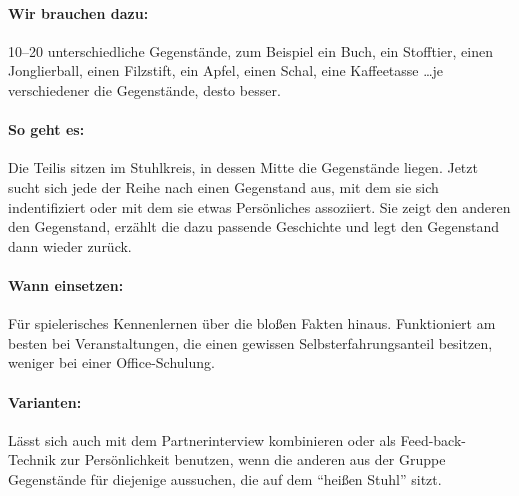 \paragraph{Wir brauchen dazu:} 10--20 unterschiedliche Gegenstände, zum Beispiel ein Buch, ein Stofftier, einen Jonglierball, einen Filzstift, ein Apfel, einen Schal, eine Kaffeetasse \ldots je verschiedener die Gegenstände, desto besser. 
\paragraph{So geht es:} Die Teilis sitzen im Stuhlkreis, in dessen Mitte die Gegenstände liegen. Jetzt sucht sich jede der Reihe nach einen Gegenstand aus, mit dem sie sich indentifiziert oder mit dem sie etwas Persönliches assoziiert. Sie zeigt den anderen den Gegenstand, erzählt die dazu passende Geschichte und legt den Gegenstand dann wieder zurück.
\paragraph{Wann einsetzen:} Für spielerisches Kennenlernen über die bloßen Fakten hinaus. Funktioniert am besten bei Veranstaltungen, die einen gewissen Selbsterfahrungsanteil besitzen, weniger bei einer Office-Schulung. 
\paragraph{Varianten:} Lässt sich auch mit dem Partnerinterview kombinieren oder als Feed-back-Technik zur Persönlichkeit benutzen, wenn die anderen aus der Gruppe Gegenstände für diejenige aussuchen, die auf dem "`heißen Stuhl"' sitzt.

